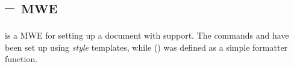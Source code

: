 \documentclass{article}
\begin{document}
\section*{ -- \textsc{mwe}}

 is a MWE for setting up a document with 
support.  The commands  and  have been set up using
\emph{style} templates, while  () was defined as a simple
formatter function.
\end{document}
